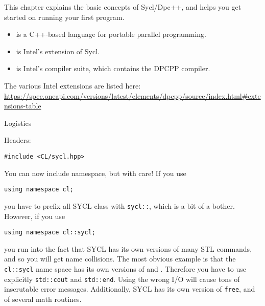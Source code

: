 
This chapter explains the basic concepts of Sycl/Dpc++,
and helps you get
started on running your first program.

\begin{itemize}
\item {} is a C++-based language for portable parallel programming.
\item {} is Intel's extension of Sycl.
\item {} is Intel's compiler suite,
  which contains the \ac{DPCPP} compiler.
\end{itemize}

\begin{dpcppnote}
  The various Intel extensions are listed here:
  \url{https://spec.oneapi.com/versions/latest/elements/dpcpp/source/index.html#extensions-table}
\end{dpcppnote}

 {Logistics}

Headers:
\begin{lstlisting}
#include <CL/sycl.hpp>
\end{lstlisting}

You can now include namespace, but with care!
If you use
\begin{lstlisting}
using namespace cl;
\end{lstlisting}
you have to prefix all SYCL class with \lstinline+sycl::+,
which is a bit of a bother.
However, if you use
\begin{lstlisting}
using namespace cl::sycl;
\end{lstlisting}
you run into the fact that SYCL has its own versions of many \ac{STL}
commands, and so you will get name collisions.
The most obvious example is that 
the \lstinline+cl::sycl+ name space has its own versions of  and .
Therefore you have to use explicitly \lstinline+std::cout+ and \lstinline+std::end+.
Using the wrong I/O will cause tons of inscrutable error messages.
Additionally, SYCL has its own version of \lstinline{free},
and of several math routines.

